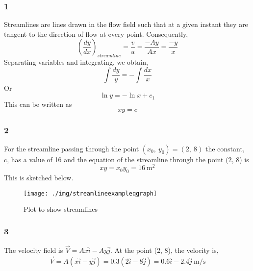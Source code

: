 \subsubsection{1}
Streamlines are lines drawn in the flow field such that at a given instant they are tangent to the direction of flow at every point. Consequently,
\begin{equation}
  \left( \frac{dy}{dx} \right)_{streamline} = \frac{v}{u} = \frac{-Ay}{Ax} = \frac{-y}{x}
\end{equation}
Separating variables and integrating, we obtain,
\begin{equation}
  \int \frac{dy}{y} = - \int \frac{dx}{x}
\end{equation}
Or
\begin{equation}
  \ln{y} = - \ln{x} + c_1
\end{equation}
This can be written as
\begin{equation}
  xy = c
\end{equation}
\subsubsection{2}
For the streamline passing through the point $(x_0, \ y_0) = (2, \ 8)$ the constant, c, has a value of 16 and the equation of the streamline through the point (2, 8) is
\begin{equation}
  xy = x_0y_0 = 16 \ \si{\meter\squared}
\end{equation}
This is sketched below.
\begin{figure}[h]
  \centering
  \texttt{[image: ./img/streamlineexampleqgraph]}
  \caption{Plot to show streamlines}
\end{figure}
\subsubsection{3}
The velocity field is $\vec{V} = Ax\hat{i} - Ay\hat{j}$. At the point (2, 8), the velocity is,
\begin{equation}
  \vec{V} = A(x\hat{i} - y\hat{j}) = 0.3(2\hat{i} - 8 \hat{j}) = 0.6\hat{i} - 2.4\hat{j} \ \si{\meter\per\second}
\end{equation}
